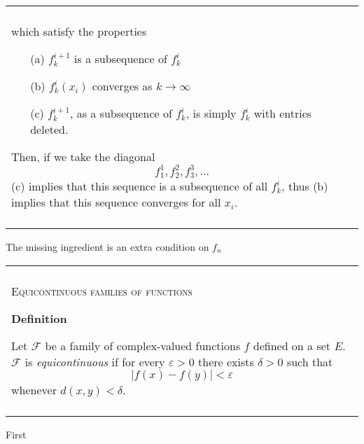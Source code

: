 \documentclass{article}
\newenvironment{myboxed}{\bigskip\noindent\begin{tabular}{|p{.975\linewidth}|}\hline \\}{\\\\\hline\end{tabular}\bigskip}
\begin{document}
\begin{myboxed}
    which satisfy the properties
    \begin{itemize}
        \item[(a)] $f^{i+1}_k$ is a subsequence of $f^i_k$
        \item[(b)] $f^i_k(x_i)$ converges as $k \to \infty$
        \item[(c)] $f^{i+1}_k$, as a subsequence of $f^i_k$, is simply $f^i_k$ with entries deleted.
    \end{itemize}

    Then, if we take the diagonal
    \[f^1_1, f^2_2,  f^3_3, \ldots\] 
    (c) implies that this sequence is a subsequence of all $f^i_k$, thus (b) implies that this sequence converges for all $x_i$.
\end{myboxed}

The missing ingredient is an extra condition on $f_n$

\begin{myboxed}
    \textsc{Equicontinuous families of functions}

    \textbf{Definition}

    Let $\mathscr{F}$ be a family of complex-valued functions $f$ defined on a set $E$. $\mathscr{F}$ is \textit{equicontinuous} if for every $\varepsilon > 0$ there exists $\delta > 0$ such that
    \[|f(x) - f(y)| < \varepsilon\]
    whenever $d(x, y) < \delta$.
\end{myboxed}

First 
\end{document}
